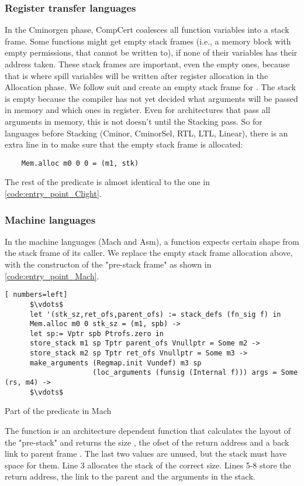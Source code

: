 \subsubsection{Register transfer languages}
In the Cminorgen phase, CompCert coalesces  all function variables into a stack frame. Some functions might get empty stack frames (i.e., a memory block with empty permissions, that cannot be written to), if none of their variables has their address taken. These stack frames are important, even the empty ones, because that is where spill variables will be written after register allocation in the Allocation phase. We follow suit and create an empty stack frame for . The stack is empty because the compiler has not yet decided what arguments will be passed in memory and which ones in register. Even for architectures that pass all arguments in memory, this is not doesn't until the Stacking pass. So for languages before Stacking (Cminor, CminorSel, RTL, LTL, Linear), there is an extra line in  to make sure that the empty stack frame is allocated:
\begin{lstlisting}
	Mem.alloc m0 0 0 = (m1, stk) \end{lstlisting}
The rest of the predicate is almost identical to the one in \ref{code:entry_point_Clight}.

\subsubsection{Machine languages}

In the machine languages (Mach and Asm), a function expects certain shape from the stack frame of its caller. We replace the empty stack frame allocation above, with the constructon of the "pre-stack frame" as shown in \ref{code:entry_point_Mach}.
\begin{table}
\begin{lstlisting}[ numbers=left]
      $\vdots$
      let '(stk_sz,ret_ofs,parent_ofs) := stack_defs (fn_sig f) in
      Mem.alloc m0 0 stk_sz = (m1, spb) ->
      let sp:= Vptr spb Ptrofs.zero in
      store_stack m1 sp Tptr parent_ofs Vnullptr = Some m2 ->
      store_stack m2 sp Tptr ret_ofs Vnullptr = Some m3 ->
      make_arguments (Regmap.init Vundef) m3 sp
                     (loc_arguments (funsig (Internal f))) args = Some (rs, m4) ->
      $\vdots$
\end{lstlisting}
\caption{Part of the  predicate in Mach}\label{code:entry_point_Mach}
\end{table}
The function  is an architecture dependent function that calculates the layout of the "pre-stack" and returns the size , the ofset of the return address  and a back link to parent frame . The last two values are unused, but the stack must have space for them. Line 3 allocates the stack of the correct size. Lines 5-8 store the return address, the link to the parent and the arguments in the stack. 